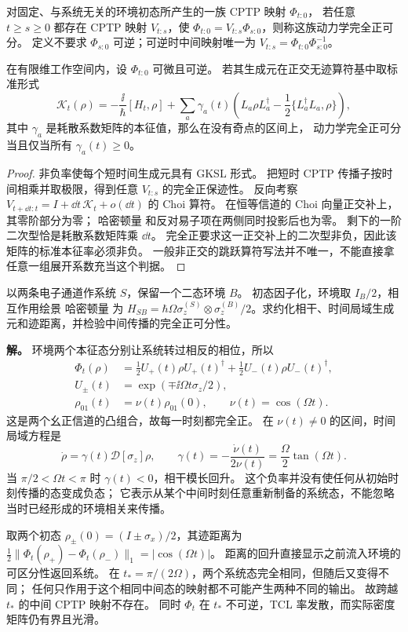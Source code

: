 \begin{definition}[完全正可分动力学]
对固定、与系统无关的环境初态所产生的一族 CPTP 映射 $\Phi_{t:0}$，
若任意 $t\ge s\ge0$ 都存在 CPTP 映射 $V_{t:s}$，使
$\Phi_{t:0}=V_{t:s}\Phi_{s:0}$，则称这族动力学完全正可分。
定义不要求 $\Phi_{s:0}$ 可逆；可逆时中间映射唯一为
$V_{t:s}=\Phi_{t:0}\Phi_{s:0}^{-1}$。
\end{definition}

\begin{proposition}[可逆时间局域方程的瞬时率判据]
在有限维工作空间内，设 $\Phi_{t:0}$ 可微且可逆。
若其生成元在正交无迹算符基中取标准形式
\[
\mathcal K_t(\rho)=-\frac{\ii}{\hbar}[H_t,\rho]
+\sum_a\gamma_a(t)
\left(L_a\rho L_a^\dagger-\frac12\{L_a^\dagger L_a,\rho\}\right),
\]
其中 $\gamma_a$ 是耗散系数矩阵的本征值，那么在没有奇点的区间上，
动力学完全正可分当且仅当所有 $\gamma_a(t)\ge0$。
\end{proposition}
\begin{proof}
非负率使每个短时间生成元具有 GKSL 形式。
把短时 CPTP 传播子按时间相乘并取极限，得到任意 $V_{t:s}$ 的完全正保迹性。
反向考察 $V_{t+\dd t:t}=I+\dd t\,\mathcal K_t+o(\dd t)$ 的 Choi 算符。
在恒等信道的 Choi 向量正交补上，其零阶部分为零；
哈密顿量 和反对易子项在两侧同时投影后也为零。
剩下的一阶二次型恰是耗散系数矩阵乘 $\dd t$。
完全正要求这一正交补上的二次型非负，因此该矩阵的标准本征率必须非负。
一般非正交的跳跃算符写法并不唯一，不能直接拿任意一组展开系数充当这个判据。
\end{proof}

\begin{exbox}
以两条电子通道作系统 $S$，保留一个二态环境 $B$。
初态因子化，环境取 $I_B/2$，相互作用绘景 哈密顿量 为
$H_{SB}=\hbar\Omega\sigma_z^{(S)}\otimes\sigma_z^{(B)}/2$。求约化相干、时间局域生成元和迹距离，并检验中间传播的完全正可分性。

\textbf{解。}
环境两个本征态分别让系统转过相反的相位，所以
\begin{align*}
\Phi_t(\rho)&=\frac12U_+(t)\rho U_+(t)^\dagger
+\frac12U_-(t)\rho U_-(t)^\dagger,\\
U_\pm(t)&=\exp(\mp\ii\Omega t\sigma_z/2),\\
\rho_{01}(t)&=\nu(t)\rho_{01}(0),\qquad\nu(t)=\cos(\Omega t).
\end{align*}
这是两个幺正信道的凸组合，故每一时刻都完全正。
在 $\nu(t)\ne0$ 的区间，时间局域方程是
\begin{equation}
\dot\rho=\gamma(t)\mathcal D[\sigma_z]\rho,
\qquad\gamma(t)=-\frac{\dot\nu(t)}{2\nu(t)}
=\frac{\Omega}{2}\tan(\Omega t).
\label{eq:feqo-exact-finite-memory-dephasing-revival}
\end{equation}
当 $\pi/2<\Omega t<\pi$ 时 $\gamma(t)<0$，相干模长回升。
这个负率并没有使任何从初始时刻传播的态变成负态；
它表示从某个中间时刻任意重新制备的系统态，不能忽略当时已经形成的环境相关来传播。

取两个初态 $\rho_\pm(0)=(I\pm\sigma_x)/2$，其迹距离为
$\tfrac12\|\Phi_t(\rho_+)-\Phi_t(\rho_-)\|_1=|\cos(\Omega t)|$。
距离的回升直接显示之前流入环境的可区分性返回系统。
在 $t_*=\pi/(2\Omega)$，两个系统态完全相同，但随后又变得不同；
任何只作用于这个相同中间态的映射都不可能产生两种不同的输出。
故跨越 $t_*$ 的中间 CPTP 映射不存在。
同时 $\Phi_t$ 在 $t_*$ 不可逆，TCL 率发散，而实际密度矩阵仍有界且光滑。
\end{exbox}
